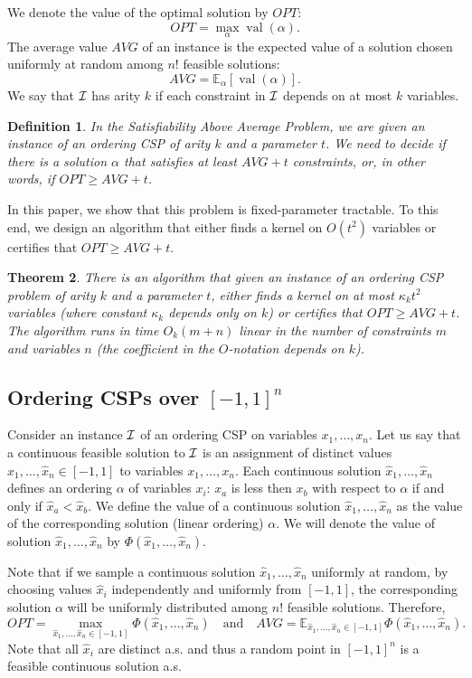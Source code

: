 \documentclass[11pt]{article}
\DeclareMathOperator {\val}  {val}
\newcommand {\Exp}       {\mathbb{E}}
\newtheorem{theorem}{Theorem}
\newtheorem{definition}[theorem]{Definition}
\begin{document}
We denote the value of the optimal solution by $OPT$:
$$OPT = \max_{\alpha} \val(\alpha).$$
The average value $AVG$ of an instance is the expected value of a solution chosen uniformly at random among $n!$ feasible solutions:
$$AVG = \Exp_{\alpha}[\val(\alpha)].$$
We say that $\cal I$ has arity $k$ if each constraint
in $\cal I$ depends on at most $k$ variables.

\begin{definition}
In the Satisfiability Above Average Problem,
we are given an instance of an ordering CSP of arity $k$
and a parameter $t$. We need to decide if there is a solution $\alpha$ that satisfies at least $AVG + t$ constraints, or, in other words, if $OPT \geq  AVG + t$.
\end{definition}

In this paper, we show that this problem is fixed-parameter tractable. To this end, we design an algorithm
that either finds a kernel on $O(t^2)$ variables or certifies that $OPT \geq  AVG + t$.
\begin{theorem}\label{thm:main}
There is an algorithm that given an instance of an
ordering CSP problem of arity $k$ and a parameter $t$,
either finds a kernel on at most $\kappa_k t^2$ variables
(where constant $\kappa_k$ depends only on $k$)
or
certifies that $OPT \geq  AVG + t$.
The algorithm runs in time $O_k(m+n)$ linear in the number of constraints $m$ and variables $n$ (the coefficient in the $O$-notation depends on $k$).	
\end{theorem}


\subsection{Ordering CSPs over $[-1,1]^n$}\label{sec:csp-over-product-space}

Consider an instance $\cal I$ of an ordering CSP on variables $x_1,\dots, x_n$.
Let us say that a continuous feasible solution to $\cal I$ is an assignment of distinct values $\hat x_1, \dots, \hat x_n \in [-1,1]$ to variables $x_1,\dots, x_n$. Each continuous solution $\hat x_1, \dots, \hat x_n$ defines
an ordering $\alpha$ of variables $x_i$: $x_a$ is less then $x_b$ with respect to $\alpha$ if and only if $\hat x_a < \hat x_b$.
We define the value of a continuous solution $\hat x_1, \dots, \hat x_n$
as the value of the corresponding solution (linear ordering) $\alpha$. We will denote the value of
solution $\hat x_1, \dots, \hat x_n$ by
$\Phi(\hat x_1, \dots, \hat x_n)$.

Note that if we sample a continuous solution
$\hat x_1, \dots, \hat x_n$ uniformly at random, by  choosing values $\hat x_i$ independently and uniformly from $[-1,1]$, the corresponding solution $\alpha$
will be uniformly distributed among $n!$ feasible solutions. Therefore,
\begin{equation*}
OPT = \max_{\hat x_1, \dots, \hat x_n\in [-1,1]} \Phi(\hat x_1, \dots, \hat x_n)\quad\text{and}\quad
AVG = \Exp_{\hat x_1, \dots, \hat x_n\in [-1,1]}
\Phi(\hat x_1, \dots, \hat x_n). 	
\end{equation*}
Note that all $\hat x_i$ are distinct a.s. and thus a random point in $[-1,1]^n$ is a feasible
continuous solution a.s. 
\end{document}
